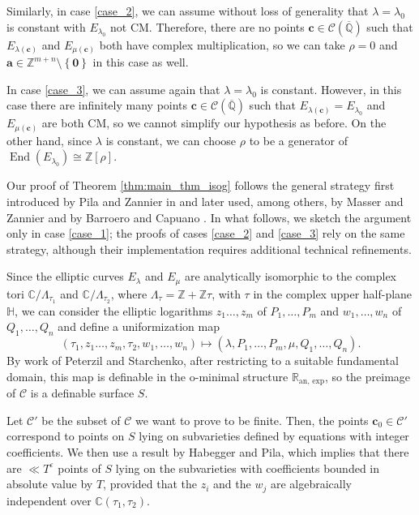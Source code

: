 \documentclass[11pt,a4paper,reqno]{amsart}
\numberwithin{equation}{section}
\newcommand{\Z}{\mathbb{Z}}
\newcommand{\Q}{\mathbb{Q}}
\newcommand{\R}{\mathbb{R}}
\newcommand{\C}{\mathbb{C}}
\renewcommand{\H}{\mathbb{H}}
\renewcommand{\c}{\mathcal{C}}
\newcommand{\cc}{\mathbf{c}}
\newcommand{\eps}{\varepsilon}
\renewcommand{\l}{\lambda}
\newcommand{\m}{\mu}
\renewcommand{\r}{\rho}
\newcommand{\pg}[1]{\left\lbrace #1 \right\rbrace}
\DeclareMathOperator{\en}{End}
\theoremstyle{remark}
\theoremstyle{definition}
\theoremstyle{definition}
\begin{document}
Similarly, in case \ref{case_2}, we can assume without loss of generality that $\l=\l_0$ is constant with $E_{\l_0}$ not CM. Therefore, there are no points $\cc \in \c(\overline{\Q})$ such that $E_{\l(\cc)}$ and $E_{\m(\cc)}$ both have complex multiplication, so we can take $\r=0$ and $\mathbf{a} \in \Z^{m+n}\setminus \pg{\mathbf{0}}$ in this case as well.

In case \ref{case_3}, we can assume again that $\l=\l_0$ is constant. However, in this case there are infinitely many points $\cc \in \c(\overline{\Q})$ such that $E_{\l(\cc)}=E_{\l_0}$ and $E_{\m(\cc)}$ are both CM, so we cannot simplify our hypothesis as before. On the other hand, since $\l$ is constant, we can choose $\r$ to be a generator of $\en(E_{\l_0})\cong\Z[\r]$.

Our proof of Theorem \ref{thm:main_thm_isog} follows the general strategy first introduced by Pila and Zannier in \cite{PZ08} and later used, among others, by Masser and Zannier \cite{MZ10, MZ12} and by Barroero and Capuano \cite{BC16, Bar19,  BC17, BC20}. In what follows, we sketch the argument only in case \ref{case_1}; the proofs of cases \ref{case_2} and \ref{case_3} rely on the same strategy, although their implementation requires additional technical refinements.

Since the elliptic curves $E_{\l}$ and $E_{\m}$ are analytically isomorphic to the complex tori $\C/\Lambda_{\tau_1}$ and $\C/\Lambda_{\tau_2}$, where $\Lambda_{\tau}=\Z+\Z\tau$, with $\tau$ in the complex upper half-plane $\H$, we can  consider the elliptic logarithms $z_1 \ldots, z_m$ of $P_1, \ldots, P_m$ and $w_1, \ldots, w_n$ of $Q_1, \ldots, Q_n$ and define a uniformization map 
$$(\tau_1,z_1 \ldots, z_m, \tau_2,w_1, \ldots, w_n) \mapsto (\l, P_1, \ldots, P_m, \m, Q_1, \ldots, Q_n).$$
By work of Peterzil and Starchenko, after restricting to a suitable fundamental domain, this map is definable in the o-minimal structure $\R_{\text{an, exp}}$, so the preimage of $\c$ is a definable surface $S$.

Let $\c'$ be the subset of $\c$ we want to prove to be finite. Then, the points $\cc_0 \in \c'$ correspond to points on $S$ lying on subvarieties defined by equations with integer coefficients. We then use a result by Habegger and Pila, which implies that there are $\ll T^{\eps}$ points of $S$ lying on the subvarieties with coefficients bounded in absolute value by $T$, provided that the $z_i$ and the $w_j$ are algebraically independent over $\C(\tau_1, \tau_2)$. 
\end{document}
